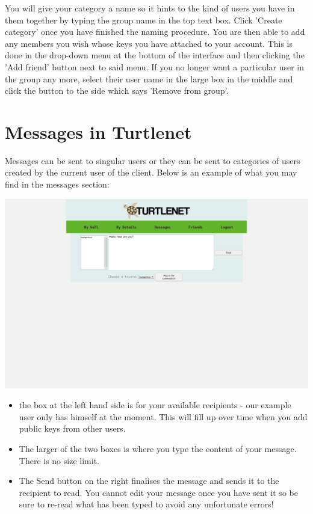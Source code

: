 You will give your category a name so it hints to the kind of users you have in
them together by typing the group name in the top text box. Click 'Create
category' once you have finished the naming procedure. You are then able to add
any members you wish whose keys you have attached to your account. This is done
in the drop-down menu at the bottom of the interface and then clicking the 'Add
friend' button next to said menu. If you no longer want a particular user in
the group any more, select their user name in the large box in the middle and
click the button to the side which says 'Remove from group'.

\pagebreak
\section{Messages in Turtlenet}
Messages can be sent to singular users or they can be sent to categories of
users created by the current user of the client. Below is an example of what
you may find in the messages section:

\includegraphics[scale=0.2]{screenshots/Screenshot from 2014-04-29 22-30-50}

\begin{itemize}
\item the box at the left hand side is for your available recipients - our
      example user only has himself at the moment. This will fill up over time
      when you add public keys from other users.
\item The larger of the two boxes is where you type the content of your message.
      There is no size limit.
\item The Send button on the right finalises the message and sends it to the
      recipient to read. You cannot edit your message once you have sent it
      so be sure to re-read what has been typed to avoid any unfortunate errors!
\end{itemize}

